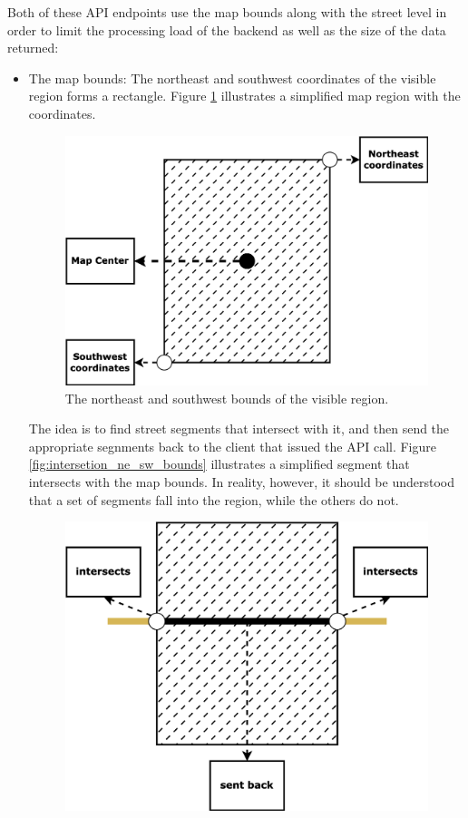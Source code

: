 Both of these API endpoints use the map bounds along with the street level in order to limit the processing load of the backend as well as the size of the data returned:
\begin{itemize}
    \item The map bounds: The northeast and southwest coordinates of the visible region forms a rectangle. Figure \ref{fig:ne_sw_bounds} illustrates a simplified map region with the coordinates.
    \begin{figure}[H]
        \centering
        \includegraphics[width=0.7\linewidth]{assets/images/Research/API/ne_sw_bounds.png}
        \caption{The northeast and southwest bounds of the visible region.}
        \label{fig:ne_sw_bounds}
    \end{figure}
    The idea is to find street segments that intersect with it, and then send the appropriate segnments back to the client that issued the API call. Figure \ref{fig:intersetion_ne_sw_bounds} illustrates a simplified segment that intersects with the map bounds. In reality, however, it should be understood that a set of segments fall into the region, while the others do not.
    \begin{figure}[H]
        \centering
        \includegraphics[width=0.7\linewidth]{assets/images/Research/API/inaction_ne_sw--bounds.png}

\end{figure}
\end{itemize}
